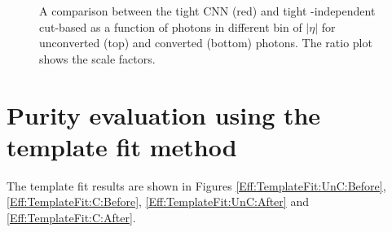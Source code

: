 \begin{figure}[htbp]
	\begin{tcolorbox}[colback=black!5!white,colframe=white!75!black]
    \caption{A comparison between the tight CNN (red) and tight \eT-independent cut-based as a function of photons \eT in different bin of $|\eta|$ for unconverted (top) and converted (bottom) photons. The ratio plot shows the scale factors.}
    \label{Eff:Tight:AddBins}
    \end{tcolorbox}
    
\end{figure}

\section{Purity evaluation using the template fit method}
\label{Adx2:TemplateFit}
The template fit results are shown in Figures \ref{Eff:TemplateFit:UnC:Before}, \ref{Eff:TemplateFit:C:Before}, \ref{Eff:TemplateFit:UnC:After} and \ref{Eff:TemplateFit:C:After}. 

